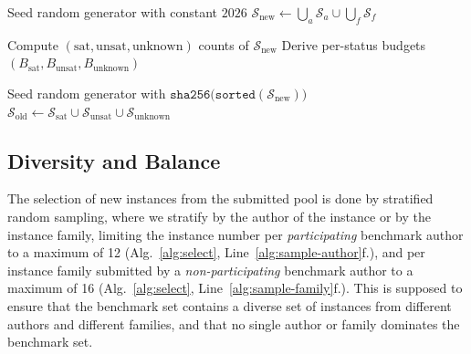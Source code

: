 \documentclass[conference]{IEEEtran}
\begin{document}
\begin{algorithm}[t]
\DontPrintSemicolon
\LinesNumbered
\caption{Benchmark Compilation}
\label{alg:select}



\BlankLine
{}
Seed random generator with constant $2026$\;\label{alg:seed-new}
$\mathcal{S}_\text{new} \leftarrow \bigcup_a \mathcal{S}_a \cup \bigcup_f \mathcal{S}_f$\;

\BlankLine
{}
Compute $(\text{sat}, \text{unsat}, \text{unknown})$ counts of $\mathcal{S}_\text{new}$\;\label{alg:budget}
Derive per-status budgets $(B_\text{sat}, B_\text{unsat}, B_\text{unknown})$\;

\BlankLine
{}
Seed random generator with $\texttt{sha256}\bigl(\texttt{sorted}(\mathcal{S}_\text{new})\bigr)$\;\label{alg:seed-old}
$\mathcal{S}_\text{old} \leftarrow \mathcal{S}_\text{sat} \cup \mathcal{S}_\text{unsat} \cup \mathcal{S}_\text{unknown}$\;

\BlankLine
{}\;
\end{algorithm}

\subsection{Diversity and Balance}\label{sec:balance}

The selection of new instances from the submitted pool is done by stratified random sampling, where we stratify by the author of the instance or by the instance family, limiting the instance number per \emph{participating} benchmark author to a maximum of 12 (Alg.~\ref{alg:select}, Line~\ref{alg:sample-author}f.), and per instance family submitted by a \emph{non-participating} benchmark author to a maximum of 16 (Alg.~\ref{alg:select}, Line~\ref{alg:sample-family}f.).
This is supposed to ensure that the benchmark set contains a diverse set of instances from different authors and different families, and that no single author or family dominates the benchmark set.
\end{document}
